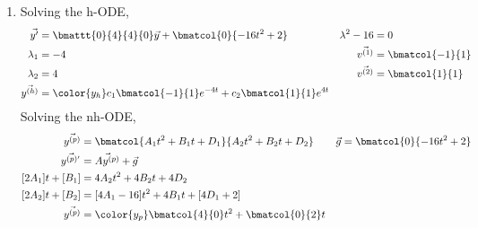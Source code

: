 \begin{enumerate}
    \item Solving the h-ODE,
          \begin{align}
              \vec{y'}                  & = \bmattt{0}{4}{4}{0} \vec{y}
              + \bmatcol{0}{-16t^2 + 2} &
              \lambda^{2} - 16          & = 0                             \\
              \lambda_1                 & = -4                          &
              \vec{v^{(1)}}             & = \bmatcol{-1}{1}               \\
              \lambda_2                 & = 4                           &
              \vec{v^{(2)}}             & = \bmatcol{1}{1}                \\
              \vec{y^{(h)}}             & = \color{y_h}
              c_1 \bmatcol{-1}{1}e^{-4t} + c_2 \bmatcol{1}{1} e^{4t}
          \end{align}
          Solving the nh-ODE,
          \begin{align}
              \vec{y^{(p)}}           & = \bmatcol{A_1 t^2 + B_1 t + D_1}
              {A_2 t^2 + B_2 t + D_2} &
              \vec{g}                 & = \bmatcol{0}{-16t^2 + 2}         \\
              \vec{y^{(p)'}}          & = \vec{Ay^{(p)}} + \vec{g}        \\
              [2A_1]t + [B_1]         & = 4A_2 t^2 + 4B_2 t + 4D_2        \\
              [2A_2]t + [B_2]         & = [4A_1 - 16]t^2 + 4B_1 t
              + [4D_1 + 2]                                                \\
              \vec{y^{(p)}}           & = \color{y_p} \bmatcol{4}{0}t^2
              + \bmatcol{0}{2}t
          \end{align}


\end{enumerate}
